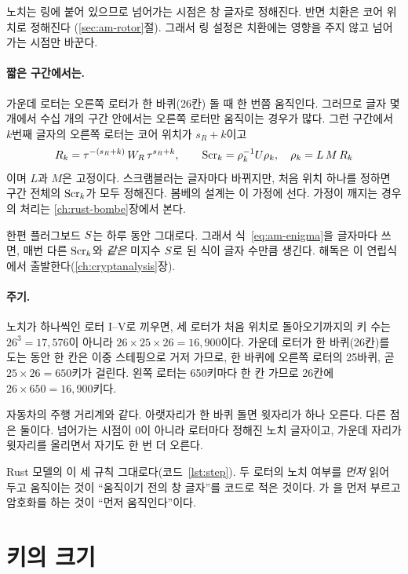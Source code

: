 \Why 노치는 링에 붙어 있으므로 넘어가는 시점은 창 글자로 정해진다. 반면 치환은 코어 위치로 정해진다
(\ref{sec:am-rotor}절). 그래서 링 설정은 치환에는 영향을 주지 않고 넘어가는 시점만 바꾼다.

\paragraph{짧은 구간에서는.} 가운데 로터는 오른쪽 로터가 한 바퀴(26칸) 돌 때 한 번쯤 움직인다. 그러므로 글자 몇
개에서 수십 개의 구간 안에서는 오른쪽 로터만 움직이는 경우가 많다. 그런 구간에서 $k$번째 글자의 오른쪽 로터는 코어
위치가 $s_R + k$이고
\[
  R_k = \tau^{-(s_R+k)}\, W_R\, \tau^{s_R+k}, \qquad \mathrm{Scr}_k = \rho_k^{-1} U \rho_k,\quad \rho_k = L\,M\,R_k
\]
이며 $L$과 $M$은 고정이다. 스크램블러는 글자마다 바뀌지만, 처음 위치 하나를 정하면 구간 전체의 $\mathrm{Scr}_k$가 모두
정해진다. 봄베의 설계는 이 가정에 선다. 가정이 깨지는 경우의 처리는 \ref{ch:rust-bombe}장에서 본다.

한편 플러그보드 $S$는 하루 동안 그대로다. 그래서 식~\eqref{eq:am-enigma}을 글자마다 쓰면, 매번 다른 $\mathrm{Scr}_k$와
\emph{같은} 미지수 $S$로 된 식이 글자 수만큼 생긴다. 해독은 이 연립식에서 출발한다(\ref{ch:cryptanalysis}장).

\paragraph{주기.} 노치가 하나씩인 로터 I--V로 끼우면, 세 로터가 처음 위치로 돌아오기까지의 키 수는 $26^3 = 17{,}576$이 아니라 $26 \times 25 \times 26
= 16{,}900$이다. 가운데 로터가 한 바퀴(26칸)를 도는 동안 한 칸은 이중 스테핑으로 거저 가므로, 한 바퀴에 오른쪽 로터의
25바퀴, 곧 $25 \times 26 = 650$키가 걸린다. 왼쪽 로터는 650키마다 한 칸 가므로 26칸에 $26 \times 650 = 16{,}900$키다.

\General 자동차의 주행 거리계와 같다. 아랫자리가 한 바퀴 돌면 윗자리가 하나 오른다. 다른 점은 둘이다. 넘어가는 시점이
0이 아니라 로터마다 정해진 노치 글자이고, 가운데 자리가 윗자리를 올리면서 자기도 한 번 더 오른다.

\Ours Rust 모델의 이 세 규칙 그대로다(코드~\ref{lst:step}). 두 로터의 노치 여부를 \emph{먼저} 읽어 두고
움직이는 것이 ``움직이기 전의 창 글자''를 코드로 적은 것이다. 가 을 먼저 부르고 암호화를 하는
것이 ``먼저 움직인다''이다.

\section{키의 크기}\label{sec:am-keyspace}

